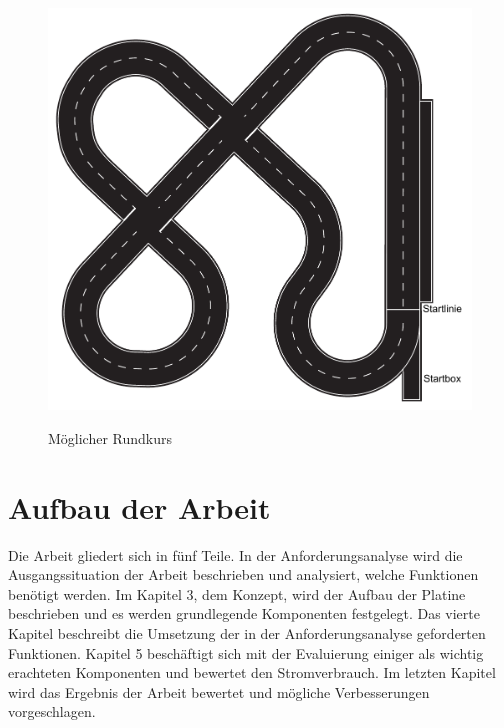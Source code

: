 \begin{figure}[H]
\centering
\includegraphics[width=.8\textwidth]{Strecke.png}\\
\caption{Möglicher Rundkurs \cite{website-carolo-cup-regelwerk}}
\label{fig:Rundkurs}
\end{figure}




\section{Aufbau der Arbeit}
Die Arbeit gliedert sich in fünf Teile. 
In der Anforderungsanalyse wird die Ausgangssituation der Arbeit beschrieben und
analysiert, welche Funktionen benötigt werden. Im Kapitel 3, dem Konzept,
wird der Aufbau der Platine beschrieben und es werden grundlegende Komponenten
festgelegt. Das vierte Kapitel beschreibt die Umsetzung der in der Anforderungsanalyse
geforderten Funktionen. Kapitel 5 beschäftigt sich mit der Evaluierung einiger
als wichtig erachteten Komponenten und bewertet den Stromverbrauch.
Im letzten Kapitel wird das Ergebnis der Arbeit bewertet und mögliche Verbesserungen
vorgeschlagen.




